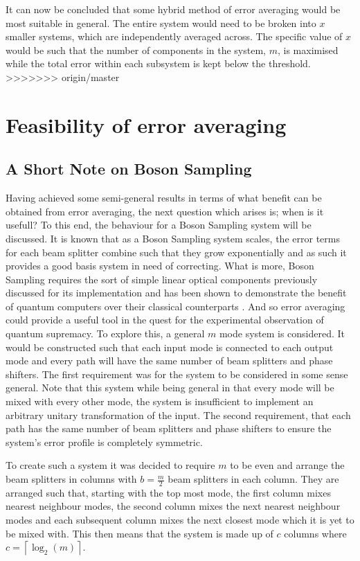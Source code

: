 \documentclass[aps,pra,twocolumn,superscriptaddress,numerical]{revtex4-1}
\begin{document}
			
			It can now be concluded that some hybrid method of error averaging would be most suitable in general. The entire system would need to be broken into $x$ smaller systems, which are independently averaged across. The specific value of $x$ would be such that the number of components in the system, $m$, is maximised while the total error within each subsystem is kept below the threshold.
>>>>>>> origin/master

\section{Feasibility of error averaging\label{Feasibility section}}

	\subsection{A Short Note on Boson Sampling\label{Boson Sampling}}

		Having achieved some semi-general results in terms of what benefit can be obtained from error averaging, the next question which arises is; when is it usefull? To this end, the behaviour for a Boson Sampling system will be discussed. It is known that as a Boson Sampling system scales, the error terms for each beam splitter combine such that they grow exponentially \cite{Boson} and as such it provides a good basis system in need of correcting. What is more, Boson Sampling requires the sort of simple linear optical components previously discussed for its implementation and has been shown to demonstrate the benefit of quantum computers over their classical counterparts \cite{Boson}. And so error averaging could provide a useful tool in the quest for the experimental observation of quantum supremacy. To explore this, a general $m$ mode system is considered. It would be constructed such that each input mode is connected to each output mode and every path will have the same number of beam splitters and phase shifters. The first requirement was for the system to be considered in some sense general. Note that this system while being general in that every mode will be mixed with every other mode, the system is insufficient to implement an arbitrary unitary transformation of the input. The second requirement, that each path has the same number of beam splitters and phase shifters to ensure the system's error profile is completely symmetric.  
				
		To create such a system it was decided to require $m$ to be even and arrange the beam splitters in columns with $b=\frac{m}{2}$ beam splitters in each column. They are arranged such that, starting with the top most mode, the first column mixes nearest neighbour modes, the second column mixes the next nearest neighbour modes and each subsequent column mixes the next closest mode which it is yet to be mixed with. This then means that the system is made up of $c$ columns where $c=\left\lceil \log_{2}(m)\right\rceil $. 
		
\end{document}
